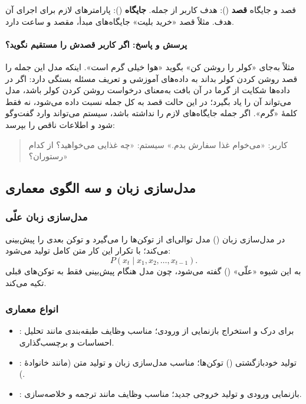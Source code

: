 \begin{definitionbox}{قصد و جایگاه}
\textbf{قصد} (): هدف کاربر از جمله. \textbf{جایگاه} (): پارامترهای لازم برای اجرای آن هدف. مثلاً قصد «خرید بلیت» جایگاه‌های مبدأ، مقصد و ساعت دارد.
\end{definitionbox}

\paragraph{پرسش و پاسخ: اگر کاربر قصدش را مستقیم نگوید؟} مثلاً به‌جای «کولر را روشن کن» بگوید «هوا خیلی گرم است». اینکه مدل این جمله را قصد روشن کردن کولر بداند به داده‌های آموزشی و تعریف مسئله بستگی دارد: اگر در داده‌ها شکایت از گرما در آن بافت به‌معنای درخواست روشن کردن کولر باشد، مدل می‌تواند آن را یاد بگیرد؛ در این حالت قصد به کل جمله نسبت داده می‌شود، نه فقط کلمهٔ «گرم». اگر جمله جایگاه‌های لازم را نداشته باشد، سیستم می‌تواند وارد گفت‌وگو شود و اطلاعات ناقص را بپرسد:

\begin{quote}
کاربر: «می‌خوام غذا سفارش بدم.» \quad سیستم: «چه غذایی می‌خواهید؟ از کدام رستوران؟»
\end{quote}

\subsection{مدل‌سازی زبان و سه الگوی معماری}
\subsubsection{مدل‌سازی زبان علّی}
در مدل‌سازی زبان () مدل توالی‌ای از توکن‌ها را می‌گیرد و توکن بعدی را پیش‌بینی می‌کند؛ با تکرار این کار متن کامل تولید می‌شود:
\[
P(x_t\mid x_1,x_2,\ldots,x_{t-1}).
\]
به این شیوه «علّی» () گفته می‌شود، چون مدل هنگام پیش‌بینی فقط به توکن‌های قبلی تکیه می‌کند.

\subsubsection{انواع معماری }
\begin{itemize}
  \item \textbf{}: برای درک و استخراج بازنمایی از ورودی؛ مناسب وظایف طبقه‌بندی مانند تحلیل احساسات و برچسب‌گذاری.
  \item \textbf{}: تولید خودبازگشتی () توکن‌ها؛ مناسب مدل‌سازی زبان و تولید متن (مانند خانوادهٔ ).
  \item \textbf{}: بازنمایی ورودی و تولید خروجی جدید؛ مناسب وظایف  مانند ترجمه و خلاصه‌سازی.
\end{itemize}

